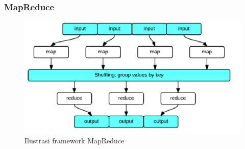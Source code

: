 		
				
\subsubsection{MapReduce}

\begin{figure}[h]
	\centering
	\includegraphics[scale=0.43]{GambarIO/map_reduce}
	\caption[Ilustrasi framework MapReduce]{Ilustrasi framework MapReduce}
	\label{fig:map_reduce}
\end{figure}
		
